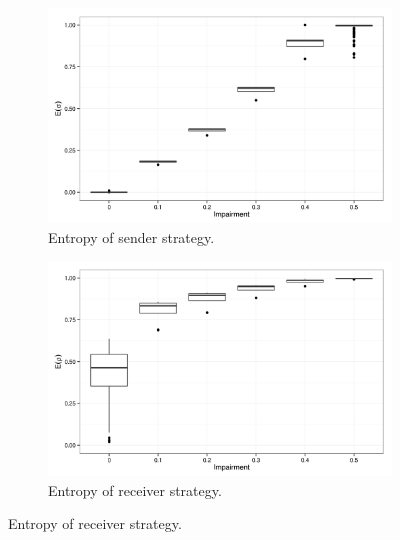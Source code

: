 \begin{figure}
        \centering
        \begin{subfigure}{0.45\textwidth}
                \includegraphics[width=\textwidth]{plots/Speaker-entropy-20140813-194306}
                \caption{Entropy of sender strategy.}
        \end{subfigure}
        \begin{subfigure}{0.45\textwidth}
                \includegraphics[width=\textwidth]{plots/Hearer-entropy-20140813-194306}
                \caption{Entropy of receiver strategy.}
        \end{subfigure}


\end{figure}
